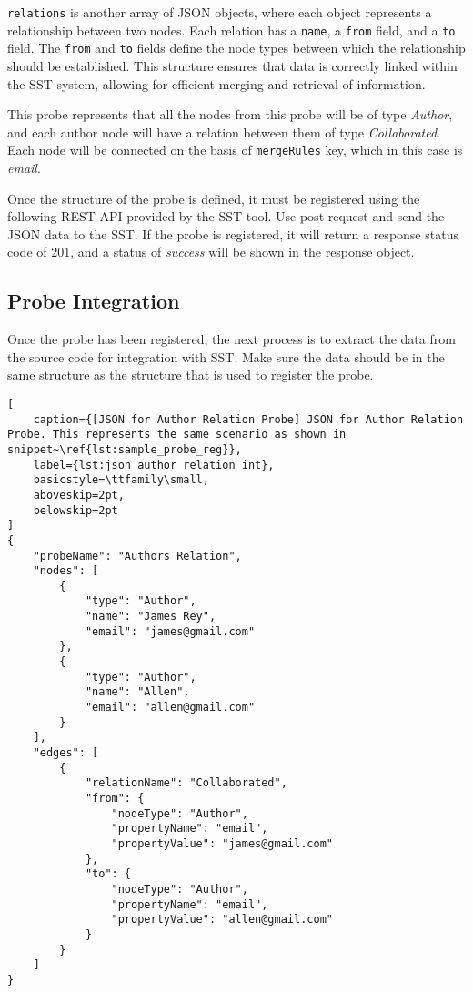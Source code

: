 \texttt{relations} is another array of JSON objects, where each object represents a relationship between two nodes. Each relation has a \texttt{name}, a \texttt{from} field, and a \texttt{to} field. The \texttt{from} and \texttt{to} fields define the node types between which the relationship should be established. This structure ensures that data is correctly linked within the SST system, allowing for efficient merging and retrieval of information.

This probe represents that all the nodes from this probe will be of type \textit{Author}, and each author node will have a relation between them of type \textit{Collaborated}. Each node will be connected on the basis of \texttt{mergeRules} key, which in this case is \textit{email}.

Once the structure of the probe is defined, it must be registered using the following REST API provided by the SST tool. Use post request and send the JSON data to the SST. If the probe is registered, it will return a response status code of 201, and a status of \textit{success} will be shown in the response object.

\subsection{Probe Integration}

Once the probe has been registered, the next process is to extract the data from the source code for integration with SST. Make sure the data should be in the same structure as the structure that is used to register the probe.

\begin{lstlisting}[
    caption={[JSON for Author Relation Probe] JSON for Author Relation Probe. This represents the same scenario as shown in snippet~\ref{lst:sample_probe_reg}}, 
    label={lst:json_author_relation_int},
    basicstyle=\ttfamily\small,
    aboveskip=2pt,
    belowskip=2pt
]
{
    "probeName": "Authors_Relation",
    "nodes": [
        {
            "type": "Author",
            "name": "James Rey",
            "email": "james@gmail.com"
        },
        {
            "type": "Author",
            "name": "Allen",
            "email": "allen@gmail.com"
        }
    ],
    "edges": [
        {
            "relationName": "Collaborated",
            "from": {
                "nodeType": "Author",
                "propertyName": "email",
                "propertyValue": "james@gmail.com"
            },
            "to": {
                "nodeType": "Author",
                "propertyName": "email",
                "propertyValue": "allen@gmail.com"
            }
        }
    ]
}
\end{lstlisting}